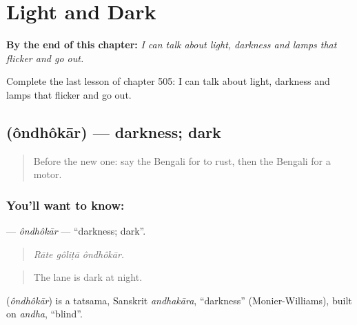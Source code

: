 
\chapter{Light and Dark}
\label{ch:bn-light-and-dark}

\begin{chapteropening}
\textbf{By the end of this chapter:} \emph{I can talk about light, darkness and lamps that flicker and go out.}

Complete the last lesson of chapter 505: I can talk about light, darkness and lamps that flicker and go out.
\end{chapteropening}

\section[\texorpdfstring{\bn{অন্ধকার} (ôndhôkār)}{অন্ধকার (ôndhôkār)}]{ (ôndhôkār) — darkness; dark}

\label{lesson:BN-C505-ondhokar}



\begin{quote}
Before the new one: say the Bengali for to rust, then the Bengali for a motor.
\end{quote}

\subsection*{You'll want to know: }
\textbf{} — \emph{ôndhôkār} — \textquotedblleft{}darkness; dark\textquotedblright{}.

\begin{quote}
  
\end{quote}

\begin{quote}
\emph{Rāte gôliṭā ôndhôkār.}
\end{quote}

\begin{quote}
The lane is dark at night.
\end{quote}

\begin{cousinweb}
\textbf{} (\emph{ôndhôkār}) is a tatsama, Sanskrit \emph{andhakāra}, \textquotedblleft{}darkness\textquotedblright{} (Monier-Williams), built on \emph{andha}, \textquotedblleft{}blind\textquotedblright{}.
\end{cousinweb}

